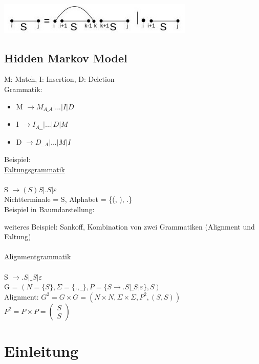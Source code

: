 \documentclass[12pt]{article}
\begin{document}
\includegraphics[width=0.7\textwidth]{rna_and_protein_src/6.jpg}

\subsection{Hidden Markov Model}


M: Match, I: Insertion, D: Deletion\\

Grammatik:
\begin{itemize}
	\item M $\to M_{A\_A} | ... | I | D$
	\item I $\to I_{A\_\_} | ... | D | M$
	\item D $\to D_{\_\_A} | ... | M | I$
\end{itemize}

Beispiel:\\

\underline{Faltungsgrammatik}\\\\
S $\to (S)S | .S| \varepsilon$\\
Nichtterminale = S, Alphabet = \{(, ), .\}\\
Beispiel in Baumdarstellung:

weiteres Beispiel: Sankoff, Kombination von zwei Grammatiken (Alignment und Faltung)\\\\
\underline{Alignmentgrammatik}\\\\
S $\to .S | \_S | \varepsilon$\\
G = $(N = \{S\}, \Sigma = \{., \_\}, P=\{S \to .S | \_S | \varepsilon\}, S)$\\
Alignment: $G^2 = G \times G = (N \times N, \Sigma \times \Sigma, P^2, (S,S))$\\
$P^2 = P \times P = 
\left(
    \begin{array}{c}
      S \\
      S
    \end{array}
  \right)
$

\section{Einleitung}
\end{document}
